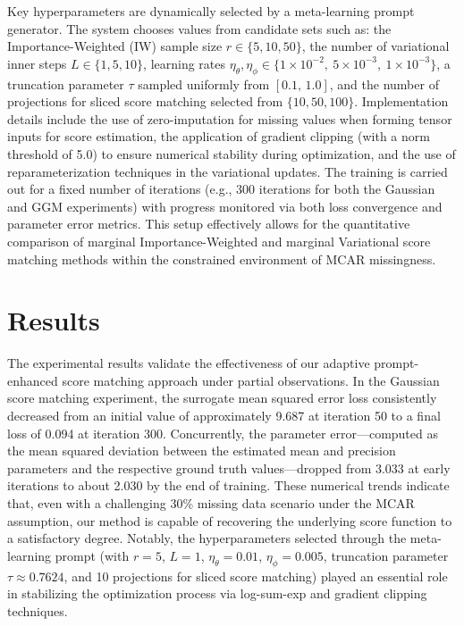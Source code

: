 \documentclass{article} %
\begin{document}
Key hyperparameters are dynamically selected by a meta-learning prompt generator. The system chooses values from candidate sets such as: the Importance-Weighted (IW) sample size \(r \in \{5, 10, 50\}\), the number of variational inner steps \(L \in \{1, 5, 10\}\), learning rates \(\eta_\theta, \eta_\phi \in \{1\times10^{-2},\ 5\times10^{-3},\ 1\times10^{-3}\}\), a truncation parameter \(\tau\) sampled uniformly from \([0.1,\,1.0]\), and the number of projections for sliced score matching selected from \(\{10,50,100\}\). Implementation details include the use of zero-imputation for missing values when forming tensor inputs for score estimation, the application of gradient clipping (with a norm threshold of 5.0) to ensure numerical stability during optimization, and the use of reparameterization techniques in the variational updates. The training is carried out for a fixed number of iterations (e.g., 300 iterations for both the Gaussian and GGM experiments) with progress monitored via both loss convergence and parameter error metrics. This setup effectively allows for the quantitative comparison of marginal Importance-Weighted and marginal Variational score matching methods within the constrained environment of MCAR missingness.

\section{Results}
The experimental results validate the effectiveness of our adaptive prompt-enhanced score matching approach under partial observations. In the Gaussian score matching experiment, the surrogate mean squared error loss consistently decreased from an initial value of approximately 9.687 at iteration 50 to a final loss of 0.094 at iteration 300. Concurrently, the parameter error—computed as the mean squared deviation between the estimated mean and precision parameters and the respective ground truth values—dropped from 3.033 at early iterations to about 2.030 by the end of training. These numerical trends indicate that, even with a challenging 30\% missing data scenario under the MCAR assumption, our method is capable of recovering the underlying score function to a satisfactory degree. Notably, the hyperparameters selected through the meta-learning prompt (with \(r=5\), \(L=1\), \(\eta_\theta=0.01\), \(\eta_\phi=0.005\), truncation parameter \(\tau\approx0.7624\), and 10 projections for sliced score matching) played an essential role in stabilizing the optimization process via log-sum-exp and gradient clipping techniques.
\end{document}
